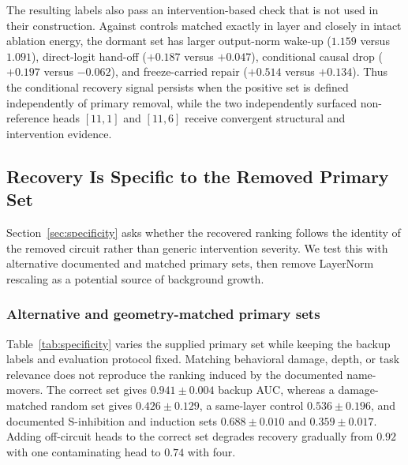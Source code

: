 The resulting labels also pass an intervention-based check that is not used in their construction.
Against controls matched exactly in layer and closely in intact ablation energy, the dormant set has larger output-norm wake-up ($1.159$ versus $1.091$), direct-logit hand-off ($+0.187$ versus $+0.047$), conditional causal drop ($+0.197$ versus $-0.062$), and freeze-carried repair ($+0.514$ versus $+0.134$).
Thus the conditional recovery signal persists when the positive set is defined independently of primary removal, while the two independently surfaced non-reference heads $[11,1]$ and $[11,6]$ receive convergent structural and intervention evidence.


\subsection{Recovery Is Specific to the Removed Primary Set}
\label{app:specificity}
\label{app:fishermatch}

Section~\ref{sec:specificity} asks whether the recovered ranking follows the identity of the removed circuit rather than generic intervention severity.
We test this with alternative documented and matched primary sets, then remove LayerNorm rescaling as a potential source of background growth.


\subsubsection{Alternative and geometry-matched primary sets}

Table~\ref{tab:specificity} varies the supplied primary set while keeping the backup labels and evaluation protocol fixed.
Matching behavioral damage, depth, or task relevance does not reproduce the ranking induced by the documented name-movers.
The correct set gives $0.941{\pm}0.004$ backup AUC, whereas a damage-matched random set gives $0.426{\pm}0.129$, a same-layer control $0.536{\pm}0.196$, and documented S-inhibition and induction sets $0.688{\pm}0.010$ and $0.359{\pm}0.017$.
Adding off-circuit heads to the correct set degrades recovery gradually from $0.92$ with one contaminating head to $0.74$ with four.

